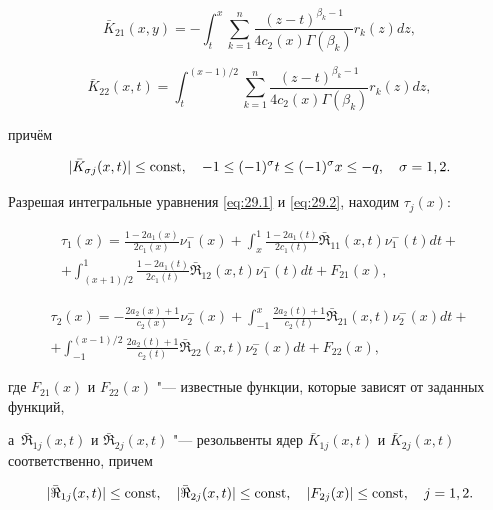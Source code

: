         $${\bar K_{21}}(x,y) =  -  \int _t^x {\sum\limits_{k = 1}^n {\frac{{{{(z - t)}^{{\beta _k} - 1}}}}{{4{c_2}(x)\Gamma ({\beta _k})}}} {r_k}(z)dz},$$

$$

{\bar K_{22}}(x,t) =  \int _t^{({{x - 1}})/{2}} {\sum\limits_{k = 1}^n {\frac{{{{(z - t)}^{{\beta _k} - 1}}}}{{4{c_2}(x)\Gamma ({\beta _k})}}} {r_k}(z)dz},$$

причём 

$$| {{{\bar K}_{\sigma j}}(x,t)} | \le {\rm const}, \quad 

-1\leq (-1)^{\sigma}t\leq (-1)^{\sigma}x\leq -q, \quad \sigma=1, 2.$$

Разрешая интегральные уравнения \eqref{eq:29.1} и \eqref{eq:29.2}, находим ${\tau _j}(x)$:

\begin{multline}

{\tau _1}(x) = \frac{{1 - 2{a_1}(x)}}{{2{c_1}(x)}}\nu _1^ - (x) +  \int _x^1 \frac{{1 - 2{a_1}(t)}}{{2{c_1}(t)}}{{\bar \Re }_{11}}(x,t)\nu _1^ - (t)dt +

\\

+  \int _{({{x + 1}})/{2}}^1 \frac{{1 - 2{a_1}(t)}}{{2{c_1}(t)}}{{\bar \Re }_{12}}(x,t)\nu _1^ - (t)dt +  {F_{21}}(x), \label{eq:30.1}

\end{multline}

\begin{multline}

{\tau _2}(x) =  - \frac{{2{a_2}(x) + 1}}{{{c_2}(x)}}\nu _2^ - (x) +  \int _{ - 1}^x \frac{{2{a_2}(t) + 1}}{{{c_2}(t)}}{{\bar \Re }_{21}}(x,t)\nu _2^ - (x)dt +

\\

+  \int _{ - 1}^{({{x - 1}})/{2}} \frac{{2{a_2}(t) + 1}}{{{c_2}(t)}}{{\bar \Re }_{22}}(x,t)\nu _2^ - (x)dt +  {F_{22}}(x), \label{eq:30.2}

\end{multline}

где ${F_{21}}(x)$ и ${F_{22}}(x)$ "--- известные функции, которые зависят от заданных функций, 

а~${\bar \Re _{1j}}(x,t)$ и ${\bar \Re _{2j}}(x,t)$ "--- резольвенты ядер ${\bar K_{1j}}(x,t)$ и ${\bar K_{2j}}(x,t)$ соответственно,  причем

\begin{equation}

| \bar \Re _{1j}(x,t) | \le {\rm const}, \quad 

| \bar \Re _{2j}(x,t) | \le {\rm const}, \quad   

| F_{2j}(x) | \le {\rm const}, \quad  j = 1, 2.\label{eq:31.j}

\end{equation}



